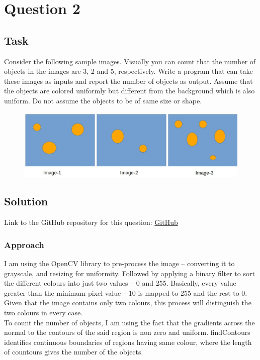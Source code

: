 \section{Question 2}

\subsection{Task}
Consider the following sample images. Visually you can count that the number of objects in the images are 3, 2 and 5, respectively. Write a program that can take these images as inputs and report the number of objects as output. Assume that the objects are colored uniformly but different from the background which is also uniform. Do not assume the objects to be of same size or shape.
\begin{figure}[!ht]
\begin{center}
	\includegraphics[width=0.75\paperwidth]{question_2/question2.eps} 
\end{center}
\end{figure} 


\subsection{Solution}

Link to the GitHub repository for this question: \href{https://github.com/Xerefic/MM2090-Solutions/tree/master/Final_Assignment/question_2}{GitHub}

\subsubsection{Approach}
I am using the OpenCV library to pre-process the image – converting it to grayscale, and resizing for uniformity. Followed by applying a binary filter to sort the different colours into just two values – 0 and 255. Basically, every value greater than the minimum pixel value +10 is mapped to 255 and the rest to 0. Given that the image contains only two colours, this process will distinguish the two colours in every case. \\
To count the number of objects, I am using the fact that the gradients across the normal to the contours of the said region is non zero and uniform. findContours identifies continuous boundaries of regions having same colour, where the length of countours gives the number of the objects.


